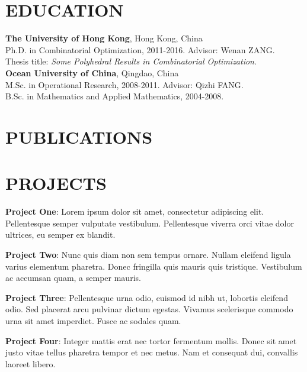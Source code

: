 \documentclass[margin]{res}
\begin{document}
\begin{resume}
\section{EDUCATION}
\textbf{The University of Hong Kong}, Hong Kong, China\\
Ph.D. in Combinatorial Optimization, 2011-2016. Advisor: Wenan ZANG.\\
Thesis title: {\sl Some Polyhedral Results in Combinatorial Optimization}.\\


\vspace{-2.5pt}
\textbf{Ocean University of China}, Qingdao, China\\
{M.Sc.} in Operational Research, 2008-2011. Advisor: Qizhi FANG.\\
{B.Sc.} in Mathematics and Applied Mathematics, 2004-2008.
\section{PUBLICATIONS}


\nocite{*}

\section{PROJECTS}
\par
\textbf{Project One}: 
Lorem ipsum dolor sit amet, consectetur adipiscing elit. Pellentesque semper 
vulputate vestibulum. Pellentesque viverra orci vitae dolor ultrices, eu semper 
ex blandit. 

\par
\textbf{Project Two}:
Nunc quis diam non sem tempus ornare. Nullam eleifend ligula varius 
elementum pharetra. Donec fringilla quis mauris quis tristique. Vestibulum ac 
accumsan quam, a semper mauris. 
\par
\textbf{Project Three}: 
Pellentesque urna odio, euismod id nibh ut,  lobortis eleifend odio. Sed 
placerat arcu pulvinar dictum egestas. Vivamus  scelerisque commodo urna sit 
amet imperdiet. Fusce ac sodales quam.

\par
\textbf{Project Four}: 
Integer mattis erat nec tortor fermentum mollis. Donec sit amet justo vitae 
tellus pharetra tempor et nec metus. Nam et consequat dui, convallis laoreet 
libero. 


\end{resume}
\end{document}
